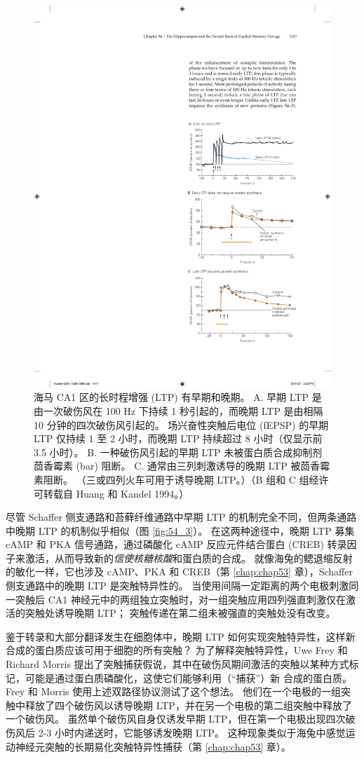 \begin{figure}[htbp]
	\centering
	\includegraphics[width=0.5\linewidth]{chap54/fig_54_5}
	\caption{海马 CA1 区的长时程增强 (LTP) 有早期和晚期。 A. 早期 LTP 是由一次破伤风在 100 Hz 下持续 1 秒引起的，而晚期 LTP 是由相隔 10 分钟的四次破伤风引起的。 场兴奋性突触后电位 (fEPSP) 的早期 LTP 仅持续 1 至 2 小时，而晚期 LTP 持续超过 8 小时（仅显示前 3.5 小时）。 B. 一种破伤风引起的早期 LTP 未被蛋白质合成抑制剂茴香霉素 (bar) 阻断。 C. 通常由三列刺激诱导的晚期 LTP 被茴香霉素阻断。 （三或四列火车可用于诱导晚期 LTP。）（B 组和 C 组经许可转载自 Huang 和 Kandel 1994。）}
	\label{fig:54_5}
\end{figure}


尽管 Schaffer 侧支通路和苔藓纤维通路中早期 LTP 的机制完全不同，但两条通路中晚期 LTP 的机制似乎相似（图 \ref{fig:54_3}）。
在这两种途径中，晚期 LTP 募集 cAMP 和 PKA 信号通路，通过磷酸化 cAMP 反应元件结合蛋白 (CREB) 转录因子来激活，从而导致新的\textit{信使核糖核酸}和蛋白质的合成。
就像海兔的鳃退缩反射的敏化一样，它也涉及 cAMP、PKA 和 CREB（第 \ref{chap:chap53} 章），Schaffer 侧支通路中的晚期 LTP 是突触特异性的。 当使用间隔一定距离的两个电极刺激同一突触后 CA1 神经元中的两组独立突触时，对一组突触应用四列强直刺激仅在激活的突触处诱导晚期 LTP；
突触传递在第二组未被强直的突触处没有改变。


鉴于转录和大部分翻译发生在细胞体中，晚期 LTP 如何实现突触特异性，这样新合成的蛋白质应该可用于细胞的所有突触？
为了解释突触特异性，Uwe Frey 和 Richard Morris 提出了突触捕获假说，其中在破伤风期间激活的突触以某种方式标记，可能是通过蛋白质磷酸化，这使它们能够利用（“捕获”）新 合成的蛋白质。
Frey 和 Morris 使用上述双路径协议测试了这个想法。
他们在一个电极的一组突触中释放了四个破伤风以诱导晚期 LTP，并在另一个电极的第二组突触中释放了一个破伤风。 虽然单个破伤风自身仅诱发早期 LTP，但在第一个电极出现四次破伤风后 2-3 小时内递送时，它能够诱发晚期 LTP。
这种现象类似于海兔中感觉运动神经元突触的长期易化突触特异性捕获（第 \ref{chap:chap53} 章）。


